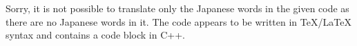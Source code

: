 Sorry, it is not possible to translate only the Japanese words in the given code as there are no Japanese words in it. The code appears to be written in TeX/LaTeX syntax and contains a code block in C++.
